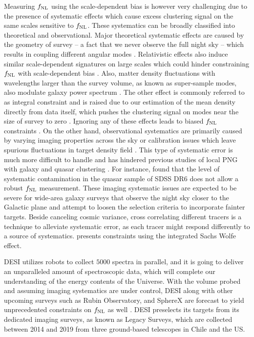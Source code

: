 Measuring $f_{\rm NL}$ using the scale-dependent bias is however very challenging due to the presence of systematic effects which cause excess clustering signal on the same scales sensitive to $f_{\rm NL}$. These systematics can be broadly classified into theoretical and observational. Major theoretical systematic effects are caused by the geometry of survey -- a fact that we never observe the full night sky -- which results in coupling different angular modes \citep{beutler2014clustering, de2019integral}. Relativistic effects also induce similar scale-dependent signatures on large scales which could hinder constraining $f_{\rm NL}$ with scale-dependent bias \citep{wang2020}. Also, matter density fluctuations with wavelengths larger than the survey volume, as known as super-sample modes, also modulate galaxy power spectrum \citep{castorina2020JCAP}. The other effect is commonly referred to as integral constraint and is raised due to our estimation of the mean density directly from data itself, which pushes the clustering signal on modes near the size of survey to zero \citep{peacock1991large, wilson2017rapid}. Ignoring any of these effects leads to biased $f_{\rm NL}$ constraints \citep{riquelme2022primordial}. On the other hand, observational systematics are primarily caused by varying imaging properties across the sky or calibration issues which leave spurious fluctuations in target density field \citep{huterer2013calibration}. This type of systematic error is much more difficult to handle and has hindered previous studies of local PNG with galaxy and quasar clustering \citep[see, e.g.,][]{Ho2015JCAP...05..040H}. For instance, \cite{pullen2013systematic} found that the level of systematic contamination in the quasar sample of SDSS DR6 does not allow a robust $f_{\rm NL}$ measurement. These imaging systematic issues are expected to be severe for wide-area galaxy surveys that observe the night sky closer to the Galactic plane and attempt to loosen the selection criteria to incorporate fainter targets. Beside canceling cosmic variance, cross correlating different tracers is a technique to alleviate systematic error, as each tracer might respond differently to a source of systematics. \cite{giannantonio2014improved} presents constraints using the integrated Sachs Wolfe effect.


 DESI utilizes robots to collect $5000$ spectra in parallel, and it is going to deliver an unparalleled amount of spectroscopic data, which will complete our understanding of the energy contents of the Universe. With the volume probed and assuming imaging systematics are under control, DESI along with other upcoming surveys such as Rubin Observatory, and SphereX are forecast to yield unprecedented constraints on $f_{\rm NL}$ as well \citep[see, e.g.,][]{Heinrich2022AAS...24020203H}. DESI preselects its targets from its dedicated imaging surveys, as known as Legacy Surveys, which are collected between 2014 and 2019 from three ground-based telescopes in Chile and the US.  
 
